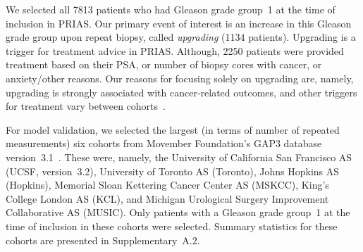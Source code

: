 We selected all 7813 patients who had Gleason grade group~1 at the time of inclusion in PRIAS. Our primary event of interest is an increase in this Gleason grade group upon repeat biopsy, called \textit{upgrading} (1134 patients). Upgrading is a trigger for treatment advice in PRIAS. Although, 2250 patients were provided treatment based on their PSA, or number of biopsy cores with cancer, or anxiety/other reasons. Our reasons for focusing solely on upgrading are, namely, upgrading is strongly associated with cancer-related outcomes, and other triggers for treatment vary between cohorts~\citep{nieboer2018active}.

For model validation, we selected the largest (in terms of number of repeated measurements) six cohorts from Movember Foundation's GAP3 database version~3.1~\citep{gap3_2018}. These were, namely, the University of California San Francisco AS (UCSF, version~3.2),  University of Toronto AS (Toronto), Johns Hopkins AS (Hopkins), Memorial Sloan Kettering Cancer Center AS (MSKCC), King's College London AS (KCL), and Michigan Urological Surgery Improvement Collaborative AS (MUSIC). Only patients with a Gleason grade group~1 at the time of inclusion in these cohorts were selected. Summary statistics for these cohorts are presented in Supplementary~A.2.